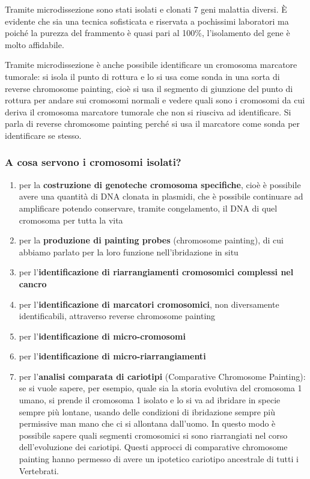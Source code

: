 \documentclass[11pt]{book}
\begin{document}
Tramite microdissezione sono stati isolati e clonati 7 geni malattia diversi.
È evidente che sia una tecnica sofisticata e riservata a pochissimi laboratori ma poiché la purezza del frammento è quasi pari al 100\%, l’isolamento del gene è molto affidabile.

Tramite microdissezione è anche possibile identificare un cromosoma marcatore tumorale: si isola il punto di rottura e lo si usa come sonda in una sorta di reverse chromosome painting, cioè si usa il segmento di giunzione del punto di rottura per andare sui cromosomi normali e vedere quali sono i cromosomi da cui deriva il cromosoma marcatore tumorale che non si riusciva ad identificare.
Si parla di reverse chromosome painting perché si usa il marcatore come sonda per identificare se stesso.


\subsubsection{A cosa servono i cromosomi isolati?}
\begin{enumerate}
\item per la \textbf{costruzione di genoteche cromosoma specifiche}, cioè è possibile avere una quantità di DNA clonata in plasmidi, che è possibile continuare ad amplificare potendo conservare, tramite congelamento, il DNA di quel cromosoma per tutta la vita
\item per la \textbf{produzione di painting probes} (chromosome painting), di cui abbiamo parlato per la loro funzione nell’ibridazione in situ
\item per l'\textbf{identificazione di riarrangiamenti cromosomici complessi nel cancro}
\item per l'\textbf{identificazione di marcatori cromosomici}, non diversamente identificabili, attraverso reverse chromosome painting
\item per l'\textbf{identificazione di micro-cromosomi}
\item per l'\textbf{identificazione di micro-riarrangiamenti}
\item per l'\textbf{analisi comparata di cariotipi} (Comparative Chromosome Painting): se si vuole sapere, per esempio, quale sia la storia evolutiva del cromosoma 1 umano, si prende il cromosoma 1 isolato e lo si va ad ibridare in specie sempre più lontane, usando delle condizioni di ibridazione sempre più permissive man mano che ci si allontana dall’uomo.
In questo modo è possibile sapere quali segmenti cromosomici si sono riarrangiati nel corso dell’evoluzione dei cariotipi. Questi approcci di comparative chromosome painting hanno permesso di avere un ipotetico cariotipo ancestrale di tutti i Vertebrati.
\end{enumerate}
\end{document}
